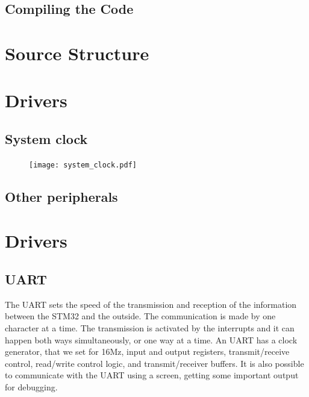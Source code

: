 \subsection{Compiling the Code}


\section{Source Structure}


\section{Drivers}

\subsection{System clock}
\begin{figure}[H]
\centering
\texttt{[image: system\_clock.pdf]}
\label{fig:advanced_system}
\end{figure}


\subsection{Other peripherals}

\section{Drivers}


\subsection{UART}
The UART sets the speed of the transmission and reception of the information between the STM32 and the outside. The communication is made by one character at a time. The transmission is activated by the interrupts and it can happen both ways simultaneously, or one way at a time. An UART has a clock generator, that we set for 16Mz, input and output registers, transmit/receive control, read/write control logic, and transmit/receiver buffers.
It is also possible to communicate with the UART using a screen, getting some important output for debugging.

